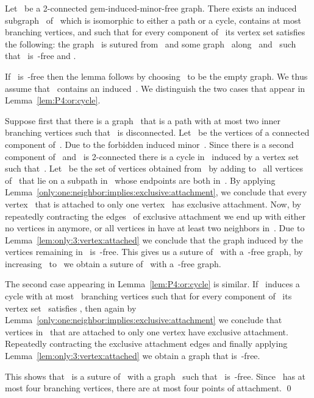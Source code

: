 \documentclass[envcountsame,envcountsect,11pt,a4paper]{llncs}
\renewenvironment{proof}{\begin{Proof}}{\qed\end{Proof}}
\begin{document}
\begin{lemma}
\label{lem:cycle:or:path:with:nice:attachemenst}
Let~ be a 2-connected gem-induced-minor-free graph. There exists an induced subgraph~ of~ which is isomorphic to either a path or a cycle, contains at most~ branching vertices,
and such that for every component of~ its vertex set  satisfies the following:
the graph~ is sutured from~ and some graph~ along~ and~ such that~ is~-free and . 
\end{lemma}
\begin{proof}
If~ is~-free then the lemma follows by choosing~ to be the empty graph.
We thus assume that~ contains an induced~.
We distinguish the two cases that appear in Lemma~\ref{lem:P4:or:cycle}.

Suppose first that there is a graph~ that is a path with at most
two inner branching vertices such that~ is disconnected. Let~ be the vertices of a  connected component of~.
Due to the forbidden induced minor~.
Since there is a second component of~ and~ is 2-connected there is a cycle in~ induced by a vertex set  such that~.
Let~ be the set of vertices obtained from~ by adding to~ all vertices of~ that lie on a subpath in~ whose endpoints are both in~.
By applying Lemma~\ref{only:one:neighbor:implies:exclusive:attachment}, we conclude that every vertex~ that is attached to only one vertex~ has
exclusive attachment.
Now, by repeatedly contracting the edges~ of exclusive attachment we end up with either
no vertices in  anymore, or all vertices in  have at least two neighbors in~.
Due to Lemma~\ref{lem:only:3:vertex:attached} we conclude that the graph induced by the vertices remaining in~ is~-free.
This gives us a suture of~ with a~-free graph, by increasing~ to~ we obtain a suture of~ with a~-free graph.

The second case appearing in Lemma~\ref{lem:P4:or:cycle} is similar. If~ induces a cycle with at most~ branching vertices such that for
every component of~ its vertex set~ satisfies , then again by Lemma~\ref{only:one:neighbor:implies:exclusive:attachment} we
conclude that vertices in~ that are attached to only one vertex have exclusive attachment. Repeatedly contracting the exclusive
attachment edges and finally applying Lemma~\ref{lem:only:3:vertex:attached} we obtain a graph that is~-free.

This shows that~ is a suture of~ with a graph~ such that~ is~-free. Since~ has at most four
branching vertices, there are at most four points of attachment.
\end{proof}
\end{document}
